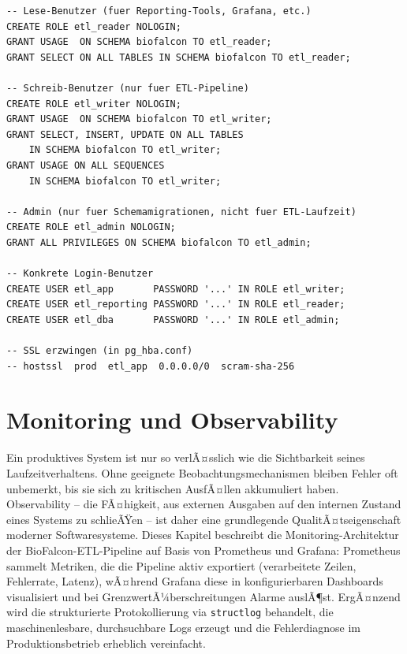 ﻿\documentclass[12pt,a4paper]{report}
\theoremstyle{definition}
\theoremstyle{remark}
\newcommand{\code}[1]{\texttt{#1}}
\begin{document}
\begin{lstlisting}[style=sql, caption={SQL: Benutzerverwaltung nach Least-Privilege-Prinzip}]
-- Lese-Benutzer (fuer Reporting-Tools, Grafana, etc.)
CREATE ROLE etl_reader NOLOGIN;
GRANT USAGE  ON SCHEMA biofalcon TO etl_reader;
GRANT SELECT ON ALL TABLES IN SCHEMA biofalcon TO etl_reader;

-- Schreib-Benutzer (nur fuer ETL-Pipeline)
CREATE ROLE etl_writer NOLOGIN;
GRANT USAGE  ON SCHEMA biofalcon TO etl_writer;
GRANT SELECT, INSERT, UPDATE ON ALL TABLES
    IN SCHEMA biofalcon TO etl_writer;
GRANT USAGE ON ALL SEQUENCES
    IN SCHEMA biofalcon TO etl_writer;

-- Admin (nur fuer Schemamigrationen, nicht fuer ETL-Laufzeit)
CREATE ROLE etl_admin NOLOGIN;
GRANT ALL PRIVILEGES ON SCHEMA biofalcon TO etl_admin;

-- Konkrete Login-Benutzer
CREATE USER etl_app       PASSWORD '...' IN ROLE etl_writer;
CREATE USER etl_reporting PASSWORD '...' IN ROLE etl_reader;
CREATE USER etl_dba       PASSWORD '...' IN ROLE etl_admin;

-- SSL erzwingen (in pg_hba.conf)
-- hostssl  prod  etl_app  0.0.0.0/0  scram-sha-256
\end{lstlisting}

\chapter{Monitoring und Observability}
\label{sec:monitoring}

Ein produktives System ist nur so verlÃ¤sslich wie die Sichtbarkeit seines Laufzeitverhaltens. Ohne geeignete Beobachtungsmechanismen bleiben Fehler oft unbemerkt, bis sie sich zu kritischen AusfÃ¤llen akkumuliert haben. Observability -- die FÃ¤higkeit, aus externen Ausgaben auf den internen Zustand eines Systems zu schlieÃŸen -- ist daher eine grundlegende QualitÃ¤tseigenschaft moderner Softwaresysteme. Dieses Kapitel beschreibt die Monitoring-Architektur der BioFalcon-ETL-Pipeline auf Basis von Prometheus und Grafana: Prometheus sammelt Metriken, die die Pipeline aktiv exportiert (verarbeitete Zeilen, Fehlerrate, Latenz), wÃ¤hrend Grafana diese in konfigurierbaren Dashboards visualisiert und bei GrenzwertÃ¼berschreitungen Alarme auslÃ¶st. ErgÃ¤nzend wird die strukturierte Protokollierung via \code{structlog} behandelt, die maschinenlesbare, durchsuchbare Logs erzeugt und die Fehlerdiagnose im Produktionsbetrieb erheblich vereinfacht.
\end{document}
